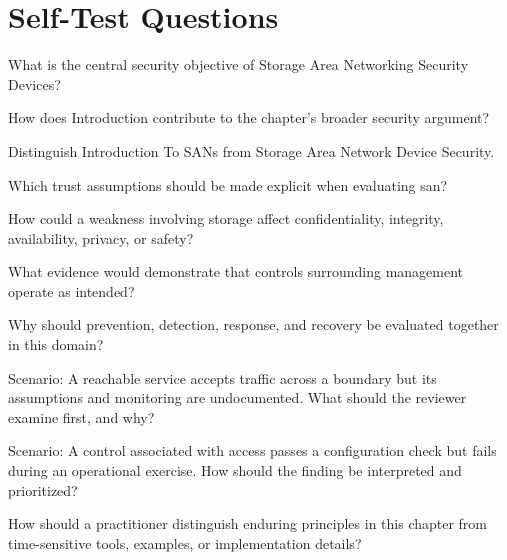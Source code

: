 \documentclass[11pt,letterpaper]{article}
\begin{document}
\section*{Self-Test Questions}
\begin{CornellRecallList}
\item What is the central security objective of Storage Area Networking Security Devices?
\item How does Introduction contribute to the chapter's broader security argument?
\item Distinguish Introduction To SANs from Storage Area Network Device Security.
\item Which trust assumptions should be made explicit when evaluating san?
\item How could a weakness involving storage affect confidentiality, integrity, availability, privacy, or safety?
\item What evidence would demonstrate that controls surrounding management operate as intended?
\item Why should prevention, detection, response, and recovery be evaluated together in this domain?
\item Scenario: A reachable service accepts traffic across a boundary but its assumptions and monitoring are undocumented. What should the reviewer examine first, and why?
\item Scenario: A control associated with access passes a configuration check but fails during an operational exercise. How should the finding be interpreted and prioritized?
\item How should a practitioner distinguish enduring principles in this chapter from time-sensitive tools, examples, or implementation details?
\end{CornellRecallList}
\end{document}
